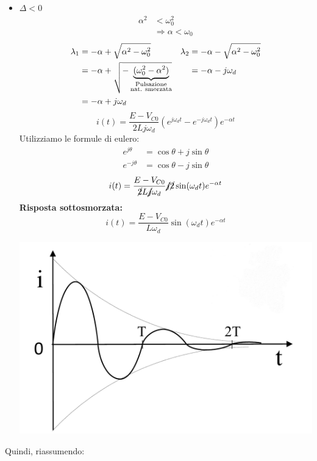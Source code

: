 \documentclass{article}
\begin{document}
\begin{itemize}
        \item $\Delta < 0$
        \begin{align*}
            \alpha^2 &< \omega^2_0 \\
            &\Rightarrow \alpha < \omega_0
        \end{align*}
        \begin{align*}
            \lambda_1 &= -\alpha + \sqrt{\alpha^2-\omega_0^2} & \lambda_2 &= -\alpha - \sqrt{\alpha^2-\omega_0^2} \\
            &= - \alpha + \sqrt{-\underbrace{(\omega_0^2 -\alpha^2)}_{\substack{\text{Pulsazione}\\\text{nat. smorzata}}}} & &=- \alpha - j \omega_d\\
            &= - \alpha + j \omega_d
        \end{align*}
        \[i(t) = \frac{E-V_{C0}}{2Lj \omega_d} \left(e^{j \omega_d t} - e^{-j \omega_d t}\right)e^{-\alpha t}\]
        Utilizziamo le formule di eulero:
        \begin{align*}
            e^{j \theta} &= \cos \theta + j \sin \theta\\
            e^{-j \theta} &= \cos \theta - j \sin \theta
        \end{align*}
        \[i(t) = \frac{E-V_{C0}}{\cancel{2}L\cancel{j} \omega_d} \cancel{j} \cancel{2} \sin (\omega_d t) e^{-\alpha t}\]
        \textbf{Risposta sottosmorzata:}
        \[i(t) = \frac{E-V_{C0}}{L \omega_d}  \sin (\omega_d t) e^{-\alpha t}\]
        \begin{center}
            \includegraphics[scale=0.25]{Image/RLC_4.png}
        \end{center}
    \end{itemize}
Quindi, riassumendo:
\end{document}
